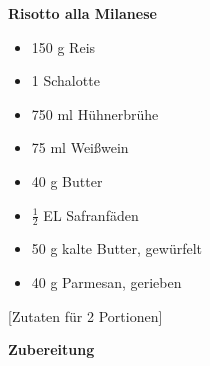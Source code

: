 

\parindent0pt	

\pagestyle{empty}


\textbf{{\LARGE Risotto alla Milanese}}%

\hrulefill
\vspace*{\fill}
\begin{multicols}{2}	


\begin{itemize}
\item 150 g 	Reis 
\item 1		Schalotte
\item 750 ml 	Hühnerbrühe
\item 75 ml 	Weißwein
\item 40 g	Butter
\item $\frac{1}{2}$ EL Safranfäden
\item 50 g 	kalte Butter, gewürfelt
\item 40 g	Parmesan, gerieben
\end{itemize}
\end{multicols}
\vfill									%

\vspace{2cm}
%
\begin{center}
%
[Zutaten für 2 Portionen]%
\end{center}


\vfill
\newpage
\textbf{{\LARGE Zubereitung}}%

\hrulefill

